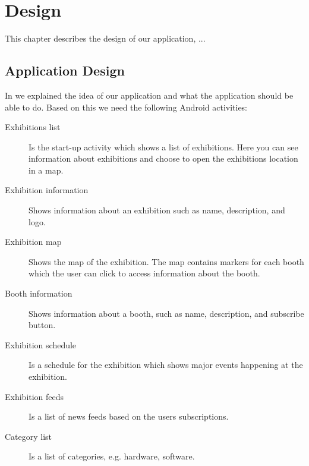 \chapter{Design}
This chapter describes the design of our application, ... 

\section{Application Design}
In  we explained the idea of our application and what the application should be able to do. Based on this we need the following Android activities:

\begin{description}
\item[Exhibitions list] Is the start-up activity which shows a list of exhibitions. Here you can see information about exhibitions and choose to open the exhibitions location in a map.
\item[Exhibition information] Shows information about an exhibition such as name, description, and logo.
\item[Exhibition map] Shows the map of the exhibition. The map contains markers for each booth which the user can click to access information about the booth.
\item[Booth information] Shows information about a booth, such as name, description, and subscribe button.
\item[Exhibition schedule] Is a schedule for the exhibition which shows major events happening at the exhibition.
\item[Exhibition feeds] Is a list of news feeds based on the users subscriptions.
\item[Category list] Is a list of categories, e.g. hardware, software.
\end{description}

